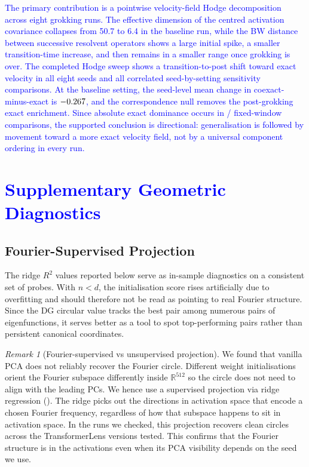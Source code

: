 \documentclass[11pt]{article}
\newcommand{\addedtext}[1]{\textcolor{blue}{#1}}
\theoremstyle{remark}
\newtheorem{remark}{Remark}
\begin{document}
\addedtext{The primary contribution is a pointwise velocity-field Hodge decomposition across eight grokking runs. The effective dimension of the centred activation covariance collapses from 50.7 to 6.4 in the baseline run, while the BW distance between successive resolvent operators shows a large initial spike, a smaller transition-time increase, and then remains in a smaller range once grokking is over. The completed Hodge sweep shows a transition-to-post shift toward exact velocity in all eight seeds and all \HodgeSensitivityComparisons{} correlated seed-by-setting sensitivity comparisons. At the baseline setting, the seed-level mean change in coexact-minus-exact is $-0.267$, and the correspondence null removes the post-grokking exact enrichment. Since absolute exact dominance occurs in \HodgeFixedPostExactComparisons/\HodgeSensitivityComparisons{} fixed-window comparisons, the supported conclusion is directional: generalisation is followed by movement toward a more exact velocity field, not by a universal component ordering in every run.}

\appendix

\section{\addedtext{Supplementary Geometric Diagnostics}}

\subsection{Fourier-Supervised Projection}
\label{sec:grokking-pca}

The ridge $R^2$ values reported below serve as in-sample diagnostics on a consistent set of probes. With $n < d$, the initialisation score rises artificially due to overfitting and should therefore not be read as pointing to real Fourier structure. Since the DG circular value tracks the best pair among numerous pairs of eigenfunctions, it serves better as a tool to spot top-performing pairs rather than persistent canonical coordinates.

\begin{remark}[Fourier-supervised vs unsupervised projection]
\label{rem:fourier-projection}
We found that vanilla PCA does not reliably recover the Fourier circle. Different weight initialisations orient the Fourier subspace differently inside $\mathbb{R}^{512}$ so the circle does not need to align with the leading PCs. We hence use a supervised projection via ridge regression (). The ridge picks out the directions in activation space that encode a chosen Fourier frequency, regardless of how that subspace happens to sit in activation space. In the runs we checked, this projection recovers clean circles across the TransformerLens versions tested. This confirms that the Fourier structure is in the activations even when its PCA visibility depends on the seed we use.
\end{remark}
\end{document}
